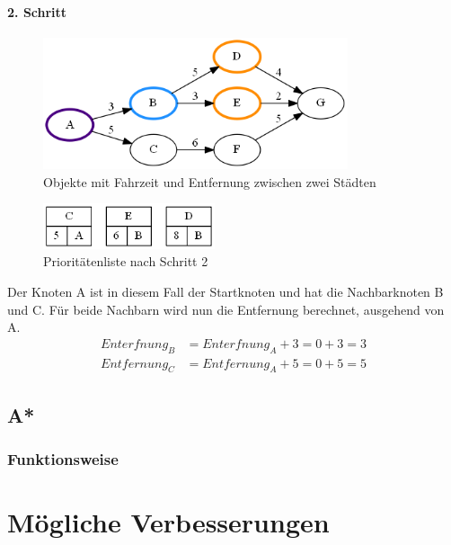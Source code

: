 \documentclass[11pt]{scrreprt}
\begin{document}
			\subsubsection{2. Schritt}
			\begin{figure}[ht]
				\centering
				\includegraphics[width=0.8\textwidth]{Graphs/Example2}
				\caption{Objekte mit Fahrzeit und Entfernung zwischen zwei Städten}
			\end{figure}
			\begin{figure}[ht]
				\centering
				\includegraphics[width=0.45\textwidth]{Graphs/Example2_PQ}
				\caption{Prioritätenliste nach Schritt 2}
			\end{figure}
			Der Knoten A ist in diesem Fall der Startknoten und hat die Nachbarknoten B und C.
			Für beide Nachbarn wird nun die Entfernung berechnet, ausgehend von A.
			\begin{align*}
			Enterfnung_B &= Enterfnung_A + 3 = 0 + 3 = 3\\
			Entfernung_C &= Entfernung_A + 5 = 0 + 5 = 5
			\end{align*}
			

\section{A*}

\subsection{Funktionsweise}

\chapter{Mögliche Verbesserungen}
\end{document}

